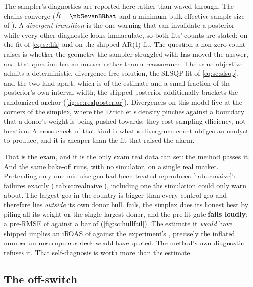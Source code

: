 The sampler's diagnostics are reported here rather than waved through.
The chains converge ($\hat R = \nbSevenBRhat$ and a minimum bulk effective sample size of
\nbSevenBEss{}). A \emph{divergent transition} is the one warning that can invalidate a posterior
while every other diagnostic looks immaculate, so both fits' counts are stated: \nbSevenBDivergences{}
on the fit of \cref{eq:sc:lik} and \nbSevenBArDivergences{} on the shipped AR(1) fit.
The question a non-zero count raises is whether the geometry the sampler struggled
with has moved the answer, and that question has an answer rather than a reassurance. The same
objective admits a deterministic, divergence-free solution, the SLSQP fit of
\cref{eq:sc:slsqp}, and the two land \kusd{\nbSevenBBayesMoved} apart, which is
\pc{\nbSevenBBayesMovedPct} of the estimate and a small fraction of the posterior's own interval
width; the shipped posterior additionally brackets the randomized anchor
(\cref{fig:sc:realposterior}). Divergences on this model live at the corners of the simplex, where
the Dirichlet's density pinches
against a boundary that a donor's weight is being pushed towards; they cost sampling efficiency,
not location. A cross-check of that kind is what a divergence count obliges an analyst to produce,
and it is cheaper than the fit that raised the alarm.

That is the exam, and it is the only exam real data can set: the method passes it. And the same
bake-off runs, with no simulator, on a single real market. Pretending only one mid-size geo had
been treated reproduces \cref{tab:sc:naive}'s failures exactly (\cref{tab:sc:realnaive}), including
one the simulation could only warn about. The largest geo in the country is bigger than every
control geo and therefore lies \emph{outside} its own donor hull.  fails, the
simplex does its honest best by piling all its weight on the single largest donor, and the pre-fit
gate \textbf{fails loudly}: a pre-RMSE of \usd{\nbSevenBHullPreRmse} against a bar of
\usd{\nbSevenBHullGateRef} (\cref{fig:sc:hullfail}). The estimate it \emph{would} have shipped implies an iROAS of
\nbSevenBHullIroas{} against the experiment's \nbSevenBDidIroas{}, precisely the inflated
number an unscrupulous deck would have quoted. The method's own diagnostic refuses it. That
self-diagnosis is worth more than the estimate.




\subsection*{The off-switch}

